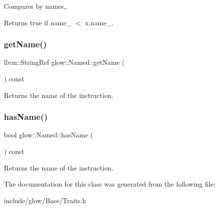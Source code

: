 Compares by names,. 

\begin{DoxyReturn}{Returns}
true if name\+\_\+ $<$ x.\+name\+\_\+. 
\end{DoxyReturn}
\mbox{\label{classglow_1_1_named_a953e8bbe0c565edf52e374d461579c4e}} 
\subsubsection{\texorpdfstring{get\+Name()}{getName()}}
{\footnotesize\ttfamily llvm\+::\+String\+Ref glow\+::\+Named\+::get\+Name (\begin{DoxyParamCaption}{ }\end{DoxyParamCaption}) const\hspace{0.3cm}{\ttfamily [inline]}}

\begin{DoxyReturn}{Returns}
the name of the instruction. 
\end{DoxyReturn}
\mbox{\label{classglow_1_1_named_aafdd13e8cd2d61adbbc9cb6fedd0acd4}} 
\subsubsection{\texorpdfstring{has\+Name()}{hasName()}}
{\footnotesize\ttfamily bool glow\+::\+Named\+::has\+Name (\begin{DoxyParamCaption}{ }\end{DoxyParamCaption}) const\hspace{0.3cm}{\ttfamily [inline]}}

\begin{DoxyReturn}{Returns}
the name of the instruction. 
\end{DoxyReturn}


The documentation for this class was generated from the following file\+:\begin{DoxyCompactItemize}
\item 
include/glow/\+Base/Traits.\+h\end{DoxyCompactItemize}
